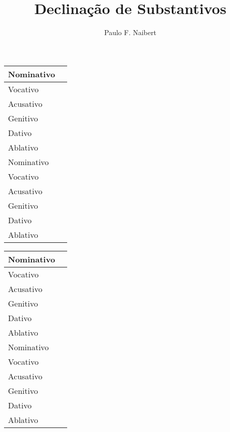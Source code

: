 \documentclass[12pt, twocolumn, a4paper, article]{article}
\numberwithin{equation}{section}
\begin{document}
\title{Declinação de Substantivos}
\author{Paulo F. Naibert}

\thispagestyle{empty}

\clearpage
{}

\clearpage

\begin{table}
\centering
\begin{tabular}[!ht]{|l|p{3cm}|} %
\hline \hline
Nominativo &  \\ \hline
Vocativo   &  \\ \hline
Acusativo  &  \\ \hline
Genitivo   &  \\ \hline
Dativo     &  \\ \hline
Ablativo   &  \\
\hline
\hline
Nominativo &  \\ \hline
Vocativo   &  \\ \hline
Acusativo  &  \\ \hline
Genitivo   &  \\ \hline
Dativo     &  \\ \hline
Ablativo   &  \\
\hline \hline
\end{tabular}
\end{table}

\begin{table}
\centering
\begin{tabular}[!ht]{|l|p{3cm}|} %
\hline \hline
Nominativo &  \\ \hline
Vocativo   &  \\ \hline
Acusativo  &  \\ \hline
Genitivo   &  \\ \hline
Dativo     &  \\ \hline
Ablativo   &  \\
\hline
\hline
Nominativo &  \\ \hline
Vocativo   &  \\ \hline
Acusativo  &  \\ \hline
Genitivo   &  \\ \hline
Dativo     &  \\ \hline
Ablativo   &  \\
\hline \hline
\end{tabular}
\end{table}
\end{document}
